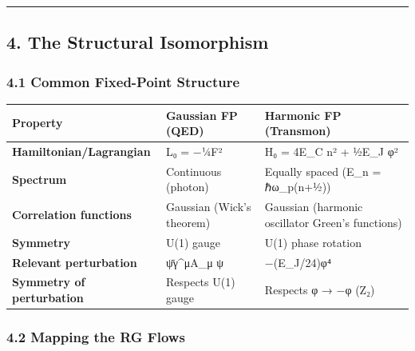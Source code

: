 \documentclass[
]{article}
\newcounter{none} %
\begin{document}
\begin{center}\rule{0.5\linewidth}{0.5pt}\end{center}

\subsection{4. The Structural
Isomorphism}\label{the-structural-isomorphism}

\subsubsection{4.1 Common Fixed-Point
Structure}\label{common-fixed-point-structure}

{\def\LTcaptype{none} %
\begin{longtable}[]{@{}
  >{\raggedright\arraybackslash}p{}
  >{\raggedright\arraybackslash}p{}
  >{\raggedright\arraybackslash}p{}@{}}
\toprule\noalign{}
\begin{minipage}[b]{\linewidth}\raggedright
Property
\end{minipage} & \begin{minipage}[b]{\linewidth}\raggedright
Gaussian FP (QED)
\end{minipage} & \begin{minipage}[b]{\linewidth}\raggedright
Harmonic FP (Transmon)
\end{minipage} \\
\midrule\noalign{}
\endhead
\bottomrule\noalign{}
\endlastfoot
\textbf{Hamiltonian/Lagrangian} & L₀ = −¼F² & H₀ = 4E\_C n² + ½E\_J
φ² \\
\textbf{Spectrum} & Continuous (photon) & Equally spaced (E\_n =
ℏω\_p(n+½)) \\
\textbf{Correlation functions} & Gaussian (Wick's theorem) & Gaussian
(harmonic oscillator Green's functions) \\
\textbf{Symmetry} & U(1) gauge & U(1) phase rotation \\
\textbf{Relevant perturbation} & ψ̄γ\^{}μA\_μ ψ & −(E\_J/24)φ⁴ \\
\textbf{Symmetry of perturbation} & Respects U(1) gauge & Respects φ →
−φ (Z₂) \\
\end{longtable}
}

\subsubsection{4.2 Mapping the RG Flows}\label{mapping-the-rg-flows}
\end{document}
